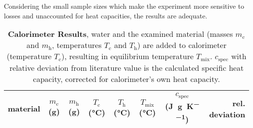 Considering the small sample sizes which make the experiment more sensitive to losses and unaccounted for heat capacities, the results are adequate.



\begin{table}[tbp]
	\centering
	\caption[Calorimeter Results]{\textbf{Calorimeter Results}, water and the examined material (masses $m_\text{c}$ and $m_\text{h}$, temperatures $T_\text{c}$ and $T_\text{h}$) are added to calorimeter (temperature $T_\text{c}$), resulting in equilibrium temperature $T_\text{mix}$. $c_\text{spec}$ with relative deviation from literature value is the calculated specific heat capacity, corrected for calorimeter's own heat capacity.}
	\label{tab:fancy-shit}
	\begin{tabular}{lSSSSSSr}
	\toprule
	{material}&
	{$m_\text{c}$ (\si{\gram})}&
	{$m_\text{h}$ (\si{\gram})}&
	{$T_\text{c}$ (\si{\celsius})}&
	{$T_\text{h}$ (\si{\celsius})}&
	{$T_\text{mix}$ (\si{\celsius})}&
	{$c_\text{spec}$ (\si{\joule\per\gram\per\kelvin})}&
	{rel. deviation}\\
	\midrule
		
	\bottomrule
	\end{tabular}
\end{table}
